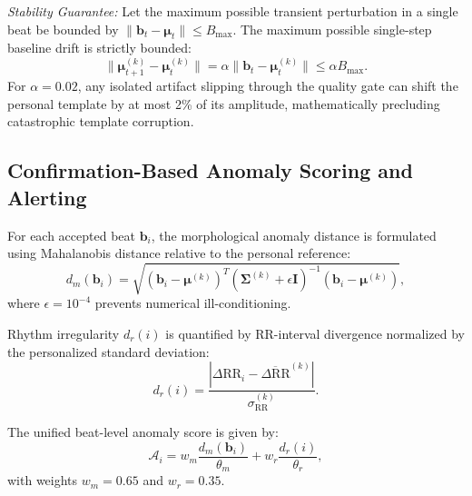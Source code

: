 \documentclass{ieeeaccess}
\begin{document}
\textit{Stability Guarantee:} Let the maximum possible transient perturbation in a single beat be bounded by $\|\mathbf{b}_t - \mathbf{\mu}_t\| \le B_{\max}$. The maximum possible single-step baseline drift is strictly bounded:
\begin{equation}
\|\mathbf{\mu}_{t+1}^{(k)} - \mathbf{\mu}_t^{(k)}\| = \alpha \|\mathbf{b}_t - \mathbf{\mu}_t^{(k)}\| \le \alpha B_{\max}.
\end{equation}
For $\alpha = 0.02$, any isolated artifact slipping through the quality gate can shift the personal template by at most 2\% of its amplitude, mathematically precluding catastrophic template corruption.

\subsection{Confirmation-Based Anomaly Scoring and Alerting}
For each accepted beat $\mathbf{b}_i$, the morphological anomaly distance is formulated using Mahalanobis distance relative to the personal reference:
\begin{equation}
d_m(\mathbf{b}_i) = \sqrt{(\mathbf{b}_i - \mathbf{\mu}^{(k)})^T (\mathbf{\Sigma}^{(k)} + \epsilon \mathbf{I})^{-1} (\mathbf{b}_i - \mathbf{\mu}^{(k)})},
\end{equation}
where $\epsilon = 10^{-4}$ prevents numerical ill-conditioning.

Rhythm irregularity $d_r(i)$ is quantified by RR-interval divergence normalized by the personalized standard deviation:
\begin{equation}
d_r(i) = \frac{|\Delta \mathrm{RR}_i - \overline{\Delta \mathrm{RR}}^{(k)}|}{\sigma_{\mathrm{RR}}^{(k)}}.
\end{equation}

The unified beat-level anomaly score is given by:
\begin{equation}
\mathcal{A}_i = w_m \frac{d_m(\mathbf{b}_i)}{\theta_m} + w_r \frac{d_r(i)}{\theta_r},
\end{equation}
with weights $w_m = 0.65$ and $w_r = 0.35$.
\end{document}
